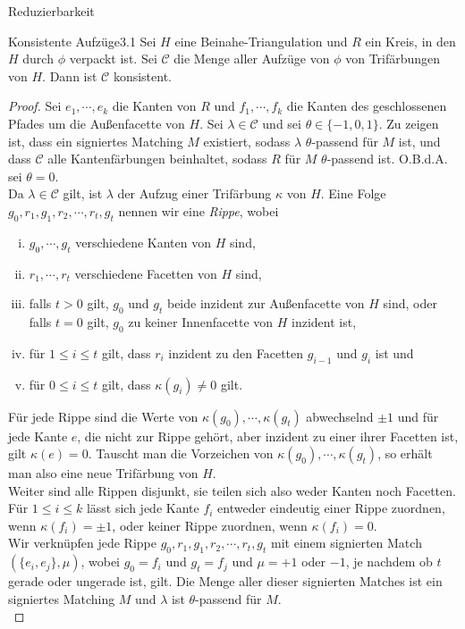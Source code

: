 \begin{section}{Reduzierbarkeit}
 \begin{satzl}{Konsistente Aufzüge}{3.1}
  Sei $H$ eine Beinahe-Triangulation und $R$ ein Kreis, in den $H$ durch $\phi$ verpackt ist. Sei $\mathscr{C}$ die Menge aller Aufzüge von $\phi$ von Trifärbungen von $H$. Dann ist $\mathscr{C}$ konsistent.
 \end{satzl}
 \begin{proof}
  Sei $e_1,\cdots,e_k$ die Kanten von $R$ und $f_1,\cdots,f_k$ die Kanten des geschlossenen Pfades um die Außenfacette von $H$. Sei $\lambda \in \mathscr{C}$ und sei $\theta \in \{-1,0,1\}$. Zu zeigen ist, dass ein signiertes Matching $M$ existiert, sodass $\lambda$ $\theta$-passend für $M$ ist, und dass $\mathscr{C}$ alle Kantenfärbungen beinhaltet, sodass $R$ für $M$ $\theta$-passend ist. O.B.d.A. sei $\theta = 0$.\\
  Da $\lambda \in \mathscr{C}$ gilt, ist $\lambda$ der Aufzug einer Trifärbung $\kappa$ von $H$. Eine Folge $g_0,r_1,g_1,r_2,\cdots,r_t,g_t$ nennen wir eine \textit{Rippe}, wobei
  \begin{enumerate}[(i)]
   \item $g_0,\cdots,g_t$ verschiedene Kanten von $H$ sind,
   \item $r_1,\cdots,r_t$ verschiedene Facetten von $H$ sind,
   \item falls $t >0$ gilt, $g_0$ und $g_t$ beide inzident zur Außenfacette von $H$ sind, oder falls $t=0$ gilt, $g_0$ zu keiner Innenfacette von $H$ inzident ist,
   \item für $1\leq i\leq t$ gilt, dass $r_i$ inzident zu den Facetten $g_{i-1}$ und $g_i$ ist und
   \item für $0\leq i\leq t$ gilt, dass $\kappa(g_i) \neq 0$ gilt.
  \end{enumerate}
  Für jede Rippe sind die Werte von $\kappa(g_0),\cdots,\kappa(g_t)$ abwechselnd $\pm 1$ und für jede Kante $e$, die nicht zur Rippe gehört, aber inzident zu einer ihrer Facetten ist, gilt $\kappa(e) = 0$. Tauscht man die Vorzeichen von $\kappa(g_0),\cdots,\kappa(g_t)$, so erhält man also eine neue Trifärbung von $H$.\\
  Weiter sind alle Rippen disjunkt, sie teilen sich also weder Kanten noch Facetten. Für $1 \leq i \leq k$ lässt sich jede Kante $f_i$ entweder eindeutig einer Rippe zuordnen, wenn $\kappa(f_i) = \pm 1$, oder keiner Rippe zuordnen, wenn $\kappa(f_i)=0$.\\
  Wir verknüpfen jede Rippe $g_0,r_1,g_1,r_2,\cdots,r_t,g_t$ mit einem signierten Match $(\{e_i,e_j\},\mu)$, wobei $g_0 = f_i$ und $g_t = f_j$ und $\mu = +1$ oder $-1$, je nachdem ob $t$ gerade oder ungerade ist, gilt. Die Menge aller dieser signierten Matches ist ein signiertes Matching $M$ und $\lambda$ ist $\theta$-passend für $M$.\\

\end{proof}
\end{section}
